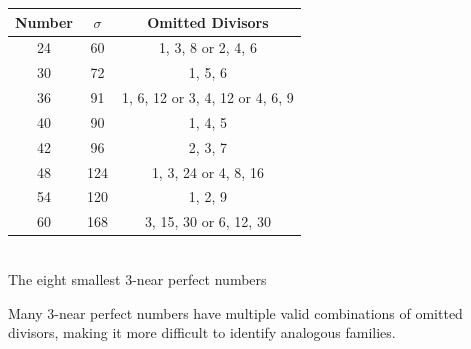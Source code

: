 \documentclass[10pt]{article}
\makeatletter
\renewcommand\subsection{\@startsection{subsection}{2}{\z@}
{-3.25ex\@plus -1ex \@minus -.2ex}
{1.5ex \@plus .2ex}
{\normalfont\normalsize\bfseries\boldmath}}
\theoremstyle{definition}
\makeatother
\begin{document}
\begin{table}[htbp]
\begin{center}
\begin{tabular}{|c|c|c|}
\hline
Number & $\sigma$ & Omitted Divisors \\
\hline
24 & 60 & 1, 3, 8 or 2, 4, 6 \\
30 & 72 & 1, 5, 6 \\
36 & 91 & 1, 6, 12 or 3, 4, 12 or 4, 6, 9 \\
40 & 90 & 1, 4, 5 \\
42 & 96 & 2, 3, 7 \\
48 & 124 & 1, 3, 24 or 4, 8, 16 \\
54 & 120 & 1, 2, 9 \\
60 & 168 & 3, 15, 30 or 6, 12, 30 \\
\hline
\end{tabular}
\\[2mm]
\small{The eight smallest $3$-near perfect numbers}
\end{center}
\end{table}

Many $3$-near perfect numbers have multiple valid combinations of omitted divisors, making it more difficult to identify analogous families.


    
    
\end{document}
